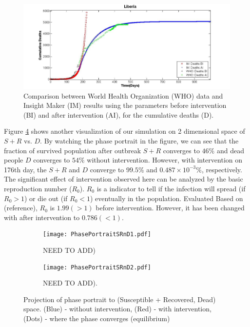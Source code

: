 \begin{figure}[!h]
  \centering
  \includegraphics[width=1\textwidth]{LB_Int2_SD_WHO_IM}
  \caption{ Comparison between World Health Organization (WHO) data and Insight Maker (IM) results using the parameters before intervention (BI) and after intervention (AI), for the cumulative deaths (D).}
\label{fig:LB_IM_WHO2} 
\end{figure}


Figure \ref{fig:PhasePortrait} shows another visualization of our simulation on 2 dimensional space of $S+R$ vs. $D$. By watching the phase portrait in the figure, we can see that the fraction of survived population after outbreak $S+R$ converges to $46\%$ and dead people $D$ converges to $54\%$ without intervention. However, with intervention on 176th day, the $S+R$ and $D$ converge to $99.5\%$ and $0.487 \times10^{-3}\%$, respectively. The significant effect of intervention observed here can be analyzed by the basic reproduction number ($R_0$). $R_0$ is a indicator to tell if the infection will spread (if $R_0>1$) or die out (if $R_0<1$) eventually in the population. Evaluated Based on (reference), $R_0$ is $1.99 (>1)$ before intervention. However, it has been changed with after intervention to $0.786(<1)$.


\begin{figure}[h!]
 \centering 
 \begin{subfigure}[b]{0.38\textwidth}
  \texttt{[image: PhasePortraitSRnD1.pdf]} \caption{NEED TO ADD)} \label{fig:PhasePortraitA} \end{subfigure}
 \hspace{.1cm}
\begin{subfigure}[b]{0.38\textwidth}
 \texttt{[image: PhasePortraitSRnD2.pdf]} \caption{NEED TO ADD).} \label{fiig:PhasePortraitB} \end{subfigure} 
\caption{Projection of phase portrait to (Susceptible + Recovered, Dead) space. (Blue) - without intervention, (Red) - with intervention, (Dots) - where the phase converges (equilibrium)}
\label{fig:PhasePortrait} 
\end{figure}





